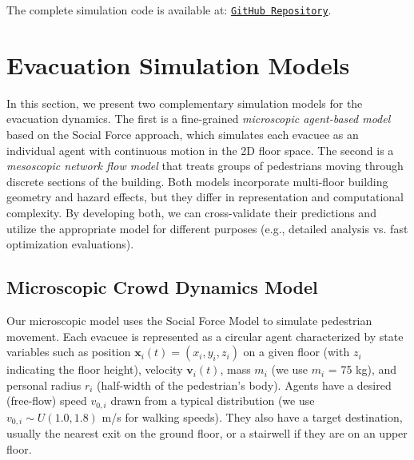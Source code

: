 \documentclass[11pt,a4paper]{article}
\begin{document}
The complete simulation code is available at: \href{https://github.com/ghiffaryr/SmartEvacuationOfMultiFloorBuildingsUsingCrowdDynamicsAndOptimization}{\texttt{GitHub Repository}}.

\section{Evacuation Simulation Models}
In this section, we present two complementary simulation models for the evacuation dynamics. The first is a fine-grained \textit{microscopic agent-based model} based on the Social Force approach, which simulates each evacuee as an individual agent with continuous motion in the 2D floor space. The second is a \textit{mesoscopic network flow model} that treats groups of pedestrians moving through discrete sections of the building. Both models incorporate multi-floor building geometry and hazard effects, but they differ in representation and computational complexity. By developing both, we can cross-validate their predictions and utilize the appropriate model for different purposes (e.g., detailed analysis vs. fast optimization evaluations).

\subsection{Microscopic Crowd Dynamics Model}
Our microscopic model uses the Social Force Model \cite{helbing1995, helbing2000} to simulate pedestrian movement. Each evacuee is represented as a circular agent characterized by state variables such as position $\mathbf{x}_i(t) = (x_i, y_i, z_i)$ on a given floor (with $z_i$ indicating the floor height), velocity $\mathbf{v}_i(t)$, mass $m_i$ (we use $m_i$ = 75 kg), and personal radius $r_i$ (half-width of the pedestrian's body). Agents have a desired (free-flow) speed $v_{0,i}$ drawn from a typical distribution (we use $v_{0,i}\sim U(1.0, 1.8)$ m/s for walking speeds). They also have a target destination, usually the nearest exit on the ground floor, or a stairwell if they are on an upper floor.
\end{document}
